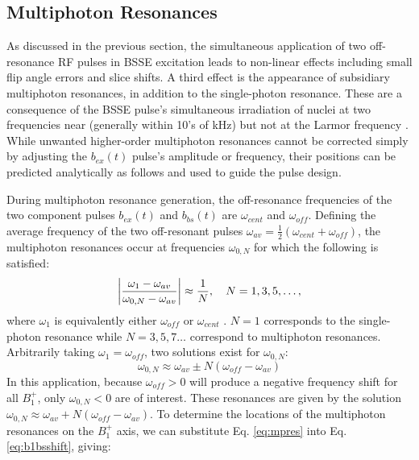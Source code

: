 \documentclass{article}
\DeclarePairedDelimiter\abs{\lvert}{\rvert}
\newcommand{\bext}{b_{ex}(t)}
\newcommand{\bbst}{b_{bs}(t)}
\begin{document}
\subsection{Multiphoton Resonances}
As discussed in the previous section, the simultaneous application of two off-resonance RF pulses in BSSE excitation
leads to non-linear effects including small flip angle errors and slice shifts. 
A third effect is the appearance of subsidiary multiphoton resonances,
in addition to the single-photon resonance. These are a consequence of the BSSE pulse's simultaneous irradiation of nuclei at two frequencies near (generally within 10's of kHz) but not at the Larmor frequency \cite{Zur1983MultiphotonI=1/2}.
While unwanted higher-order multiphoton resonances cannot be corrected simply by adjusting the $\bext$ pulse's
amplitude or frequency, 
their positions can be predicted analytically as follows and used to guide the pulse design. \par During multiphoton resonance generation, the off-resonance frequencies of the two component pulses $\bext$ and $\bbst$ are $\omega_{cent}$ and $ \omega_{off}$.
Defining the average frequency of the two off-resonant pulses $\omega_{av}= \frac{1}{2}(\omega_{cent} + \omega_{off})$, 
the multiphoton resonances occur at frequencies $\omega_{0,N}$ 
for which the following is satisfied: 
\begin{equation}
    \abs*{\frac{\omega_1-\omega_{av}}{\omega_{0,N}-\omega_{av}}} \approx \frac{1}{N}, \quad N = 1, 3, 5, \dots,
\end{equation}
where $\omega_1$ is equivalently either $\omega_{off}$ or $\omega_{cent}$ \cite{Vega1981Multiple-quantumClass}. 
$N=1$ corresponds to the single-photon resonance while $N = 3,5,7\dots$ 
correspond to multiphoton resonances.
Arbitrarily taking $\omega_1 = \omega_{off}$, two solutions exist for $\omega_{0,N}$:
\begin{equation}
    \omega_{0,N} \approx \omega_{av}\pm N(\omega_{off} - \omega_{av}) 
    \label{eq:mpres}
\end{equation}
 In this application, because $\omega_{off} > 0$ will produce a negative frequency shift for all $B_1^+$, only $\omega_{0,N} < 0$ are of interest. These resonances are given by the solution $\omega_{0,N} \approx \omega_{av}+ N(\omega_{off} - \omega_{av})$. 
To determine the locations of the multiphoton resonances on the $B_1^+$ axis,
we can substitute Eq. \ref{eq:mpres} into Eq. \ref{eq:b1bsshift}, giving: 
\end{document}
